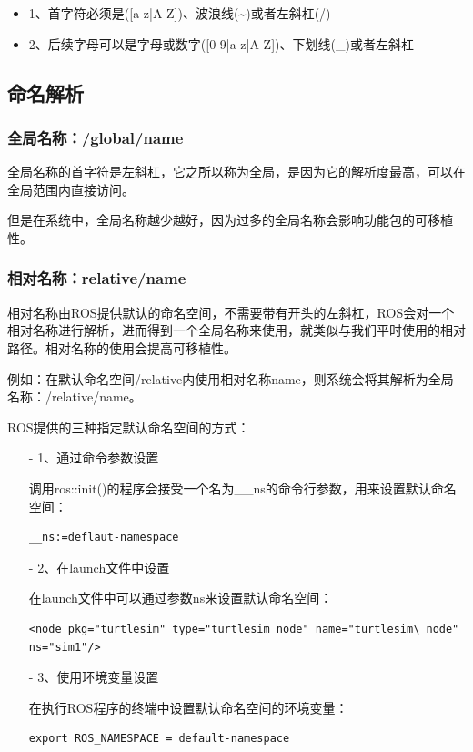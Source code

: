 \documentclass[9pt, oneside]{book}
\begin{document}
\begin{itemize}
    \item 1、首字符必须是([a-z|A-Z])、波浪线(\textasciitilde)或者左斜杠(/)
    \item 2、后续字母可以是字母或数字([0-9|a-z|A-Z])、下划线(\_)或者左斜杠
\end{itemize}

\subsection{命名解析}

\subsubsection{全局名称：/global/name}

全局名称的首字符是左斜杠，它之所以称为全局，是因为它的解析度最高，可以在全局范围内直接访问。

但是在系统中，全局名称越少越好，因为过多的全局名称会影响功能包的可移植性。

\subsubsection{相对名称：relative/name}

相对名称由ROS提供默认的命名空间，不需要带有开头的左斜杠，ROS会对一个相对名称进行解析，进而得到一个全局名称来使用，就类似与我们平时使用的相对路径。相对名称的使用会提高可移植性。

例如：在默认命名空间/relative内使用相对名称name，则系统会将其解析为全局名称：/relative/name。

ROS提供的三种指定默认命名空间的方式：

\begin{itemize}
    \item[-] 1、通过命令参数设置

    调用ros::init()的程序会接受一个名为\_\_ns的命令行参数，用来设置默认命名空间：

\begin{verbatim}
__ns:=deflaut-namespace
\end{verbatim}

    \item[-] 2、在launch文件中设置
    
    在launch文件中可以通过参数ns来设置默认命名空间：

\begin{verbatim}
<node pkg="turtlesim" type="turtlesim_node" name="turtlesim\_node" ns="sim1"/>
\end{verbatim}

    \item[-] 3、使用环境变量设置
    
    在执行ROS程序的终端中设置默认命名空间的环境变量：

\begin{verbatim}
export ROS_NAMESPACE = default-namespace
\end{verbatim}


\end{itemize}
\end{document}
